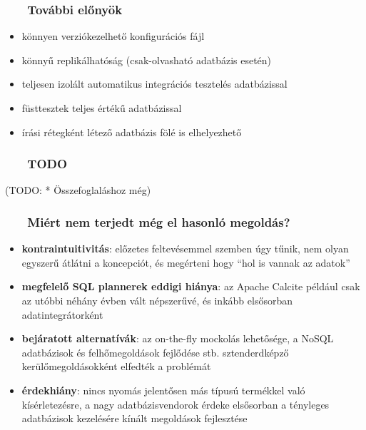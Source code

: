 \documentclass[
]{beamer}
\newcommand{\slidetitle}[2]{\frametitle{{\small #1 ~ \ding{226} ~ } \normalsize \textbf{#2} }}
\begin{document}
\begin{frame}
    \slidetitle{\sectionshorttitle}{További előnyök}
    
    \begin{itemize}
        \setlength\itemsep{1em}
        \pause \item könnyen verziókezelhető konfigurációs fájl
        \pause \item könnyű replikálhatóság (csak-olvasható adatbázis esetén)
        \pause \item teljesen izolált automatikus integrációs tesztelés adatbázissal
        \pause \item füsttesztek teljes értékű adatbázissal
        \pause \item írási rétegként létező adatbázis fölé is elhelyezhető
    \end{itemize}
\end{frame}

\begin{frame}
    \slidetitle{\sectionshorttitle}{TODO}
    
    (TODO: * Összefoglaláshoz még)
\end{frame}

\begin{frame}
    \slidetitle{\sectionshorttitle}{Miért nem terjedt még el hasonló megoldás?}

    \begin{itemize}
        \setlength\itemsep{1em}
        \pause \item \textbf{kontraintuitivitás}:
            előzetes feltevésemmel szemben úgy tűnik, nem olyan egyszerű átlátni a koncepciót,
            és megérteni hogy ``hol is vannak az adatok''
        \pause \item \textbf{megfelelő SQL plannerek eddigi hiánya}:
            az Apache Calcite például csak az utóbbi néhány évben vált népszerűvé,
            és inkább elsősorban adatintegrátorként
        \pause \item \textbf{bejáratott alternatívák}:
            az on-the-fly mockolás lehetősége,
            a NoSQL adatbázisok és felhőmegoldások fejlődése stb.
            sztenderdképző kerülőmegoldásokként elfedték a problémát
        \pause \item \textbf{érdekhiány}:
            nincs nyomás jelentősen más típusú termékkel való kísérletezésre,
            a nagy adatbázisvendorok érdeke elsősorban
            a tényleges adatbázisok kezelésére kínált megoldások fejlesztése
    \end{itemize}
\end{frame}
\end{document}
